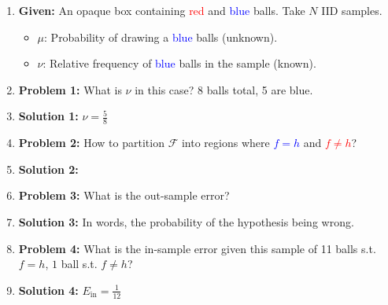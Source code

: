 \begin{example}
    \begin{enumerate}
        \item \textbf{Given:} An opaque box containing \textcolor{red}{red} and \textcolor{blue}{blue} balls. Take $N$ IID samples.
        \begin{itemize}
            \item $\mu$: Probability of drawing a \textcolor{blue}{blue} balls (unknown).
            \item $\nu$: Relative frequency of \textcolor{blue}{blue} balls in the sample (known).
        \end{itemize}
        \item \textbf{Problem 1:} What is $\nu$ in this case? 8 balls total, 5 are blue. 
        \item \textbf{Solution 1:} $\nu = \frac{5}{8}$
        \item \textbf{Problem 2:} How to partition $\mathcal{F}$ into regions where \textcolor{blue}{$f=h$} and \textcolor{red}{$f \neq h$}?
        \item \textbf{Solution 2:} 
        \item \textbf{Problem 3:} What is the out-sample error?
        \item \textbf{Solution 3:} In words, the probability of the hypothesis being wrong.
        \item \textbf{Problem 4:} What is the in-sample error given this sample of 11 balls s.t. $f=h$, $1$ ball s.t. $f \neq h$?
        \item \textbf{Solution 4:} $E_{\text{in}} = \frac{1}{12}$
        
    \end{enumerate}
\end{example}



